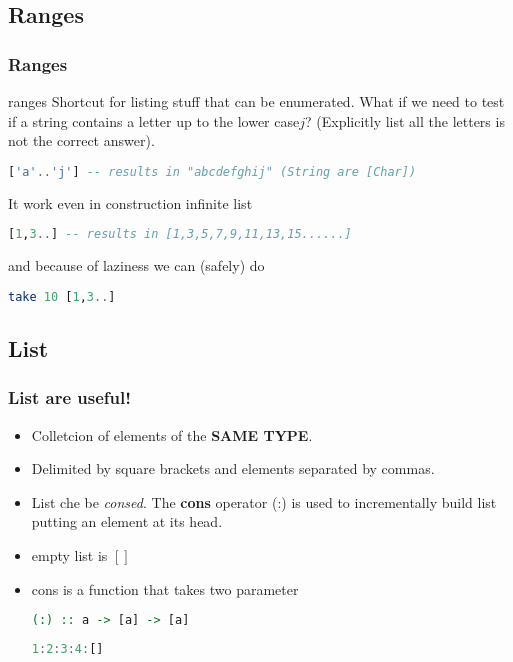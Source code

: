 	\subsection{Ranges}
	\begin{frame}[fragile]\frametitle{Ranges}
		\begin{exampleblock}{ranges}
		Shortcut for  listing stuff that can be enumerated. What if we need to test if
		a string contains a letter up to the lower case$j$? (Explicitly list all the
		letters is not the correct answer).
		\begin{lstlisting}[language=Haskell,basicstyle=\footnotesize\ttfamily] 
			['a'..'j'] -- results in "abcdefghij" (String are [Char])			
		\end{lstlisting}
		It work even in construction infinite list
		\begin{lstlisting}[language=Haskell,basicstyle=\footnotesize\ttfamily] 
			[1,3..] -- results in [1,3,5,7,9,11,13,15......]			
		\end{lstlisting}
		and because of laziness we can (safely) do
		\begin{lstlisting}[language=Haskell,basicstyle=\footnotesize\ttfamily] 
			take 10 [1,3..] 		
		\end{lstlisting}
		\end{exampleblock}
		
	\end{frame}
	
	\subsection{List}
	\begin{frame}[fragile]\frametitle{List are useful!}
	\begin{itemize}
	  \item Colletcion of elements of the \textbf{SAME TYPE}.
	  \item Delimited by square brackets and elements separated by commas.
	  \item List che be \textit{consed}. The \textbf{cons} operator (:) is used to
	  incrementally build list putting an element at its head.
	  \item empty list is $[]$
	  \item cons is a function that takes two parameter 
	  \begin{lstlisting}[language=Haskell,basicstyle=\footnotesize\ttfamily] 
			(:) :: a -> [a] -> [a]
	\end{lstlisting} 
		
	  \begin{lstlisting}[language=Haskell,basicstyle=\footnotesize\ttfamily] 
			1:2:3:4:[]	
	\end{lstlisting} 
	

	\end{itemize}
		
			
		
	\end{frame}
	
